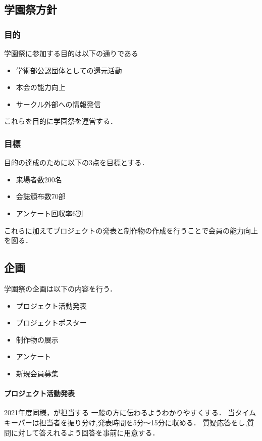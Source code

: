 \subsection*{学園祭方針}



\subsubsection*{目的}
学園祭に参加する目的は以下の通りである
\begin{itemize}
    \item 学術部公認団体としての還元活動
    \item 本会の能力向上
    \item サークル外部への情報発信
\end{itemize}
これらを目的に学園祭を運営する．

\subsubsection*{目標}
目的の達成のために以下の3点を目標とする．
\begin{itemize}
    \item 来場者数200名
    \item 会誌頒布数70部
    \item アンケート回収率6割
\end{itemize}
これらに加えてプロジェクトの発表と制作物の作成を行うことで会員の能力向上を図る．

\subsection*{企画}
学園祭の企画は以下の内容を行う．
\begin{itemize}
    \item プロジェクト活動発表
    \item プロジェクトポスター
    \item 制作物の展示
    \item アンケート
    \item 新規会員募集
\end{itemize}
\paragraph{プロジェクト活動発表}
2021年度同様\firstGrade{}，\secondGrade{}が担当する
一般の方に伝わるようわかりやすくする．
当タイムキーパーは担当者を振り分け,発表時間を5分～15分に収める．
質疑応答をし,質問に対して答えれるよう回答を事前に用意する．        
